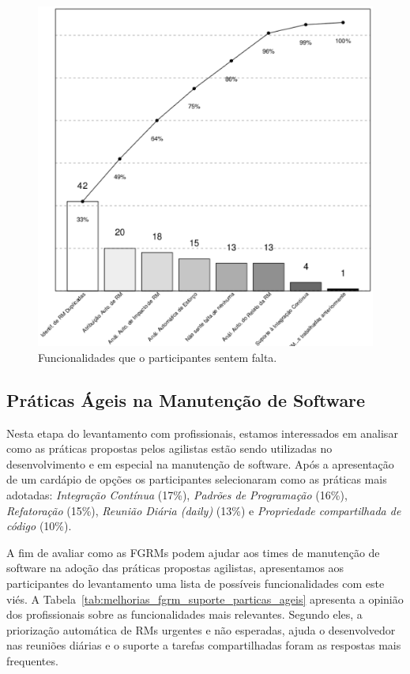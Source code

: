 \begin{figure}[htpb]
	\centering
	\includegraphics[width=0.9\linewidth]{./chapter-pesquisa-com-profissionais/img/grafico_melhorias_fgrm_funcionalidades_faltantes.eps}
	\caption{Funcionalidades que o participantes sentem falta.}
\label{fig:grafico_melhorias_fgrm_funcionalidades_falantes}
\end{figure}

\subsection{Práticas Ágeis na Manutenção de Software}
\label{sub:práticas_ágeis_na_manutenção_de_software}

Nesta etapa do levantamento com profissionais, estamos interessados em analisar
como as práticas propostas pelos agilistas estão sendo utilizadas no
desenvolvimento e em especial na manutenção de software. Após a apresentação de
um cardápio de opções os participantes selecionaram como as práticas mais
adotadas: \textit{Integração Contínua} (17\%), \textit{Padrões de Programação}
(16\%), \textit{Refatoração} (15\%), \textit{Reunião Diária (daily)} (13\%) e
\textit{Propriedade compartilhada de código} (10\%).

A fim de avaliar como as FGRMs podem ajudar aos times de manutenção de software
na adoção das práticas propostas agilistas, apresentamos aos participantes do
levantamento uma lista de possíveis funcionalidades com este viés. A
Tabela~\ref{tab:melhorias_fgrm_suporte_particas_ageis} apresenta a opinião dos
profissionais sobre as funcionalidades mais relevantes. Segundo eles, a
priorização automática de RMs urgentes e não esperadas, ajuda o desenvolvedor
nas reuniões diárias e o suporte a tarefas compartilhadas foram as respostas
mais frequentes.

